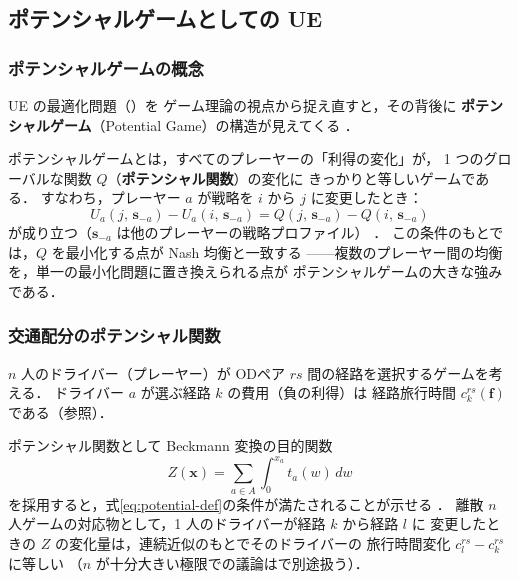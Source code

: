 \subsection{ポテンシャルゲームとしての UE}
\label{subsec:potential-game}

\subsubsection*{ポテンシャルゲームの概念}

UE の最適化問題（）を
ゲーム理論の視点から捉え直すと，その背後に
\textbf{ポテンシャルゲーム}（Potential Game）の構造が見えてくる
\cite{Monderer1996}．

ポテンシャルゲームとは，すべてのプレーヤーの「利得の変化」が，
1 つのグローバルな関数 $Q$（\textbf{ポテンシャル関数}）の変化に
きっかりと等しいゲームである．
すなわち，プレーヤー $a$ が戦略を $i$ から $j$ に変更したとき：
\begin{equation}
  U_a(j,\, \boldsymbol{s}_{-a}) - U_a(i,\, \boldsymbol{s}_{-a})
  = Q(j,\, \boldsymbol{s}_{-a}) - Q(i,\, \boldsymbol{s}_{-a})
  \label{eq:potential-def}
\end{equation}
が成り立つ（$\boldsymbol{s}_{-a}$ は他のプレーヤーの戦略プロファイル）
\cite{Monderer1996}．
この条件のもとでは，$Q$ を最小化する点が Nash 均衡と一致する
——複数のプレーヤー間の均衡を，単一の最小化問題に置き換えられる点が
ポテンシャルゲームの大きな強みである．

\subsubsection*{交通配分のポテンシャル関数}

$n$ 人のドライバー（プレーヤー）が ODペア $rs$ 間の経路を選択するゲームを考える．
ドライバー $a$ が選ぶ経路 $k$ の費用（負の利得）は
経路旅行時間 $c_k^{rs}(\boldsymbol{f})$ である（参照）．

ポテンシャル関数として Beckmann 変換の目的関数
\begin{equation}
  Z(\boldsymbol{x})
  = \sum_{a \in A} \int_0^{x_a} t_a(w)\, dw
  \label{eq:beckmann-potential}
\end{equation}
を採用すると，式\eqref{eq:potential-def}の条件が満たされることが示せる
\cite{Monderer1996,Sandholm2001}．
離散 $n$ 人ゲームの対応物として，1 人のドライバーが経路 $k$ から経路 $l$ に
変更したときの $Z$ の変化量は，連続近似のもとでそのドライバーの
旅行時間変化 $c_l^{rs} - c_k^{rs}$ に等しい
（$n$ が十分大きい極限での議論はで別途扱う）．

